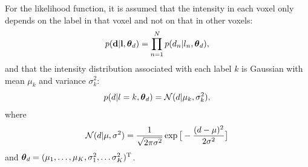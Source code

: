 \documentclass[10pt,twoside]{book}
\begin{document}
For the likelihood function, it is assumed that the intensity in each voxel only depends on the label in that voxel and not on that in other voxels:
\begin{equation}
  p(\mathbf{d} | \mathbf{l}, {\mbox{\boldmath {${\theta}$}}}_d ) = \prod_{n=1}^N p( d_n | l_n, {\mbox{\boldmath {${\theta}$}}}_d ),
  \label{eq:likelihood}
\end{equation}
and that the intensity distribution associated with each label $k$ is Gaussian with mean $\mu_k$ and variance $\sigma_k^2$:
\begin{equation}
  p( d | l=k, {\mbox{\boldmath {${\theta}$}}}_d ) = \mathcal N \mathnormal( d | \mu_k, \sigma_k^2 ),
  \label{eq:Gauss}
\end{equation}
where 
\begin{equation}
  \mathcal N \mathnormal( d | \mu, \sigma^2 ) = \frac{1}{\sqrt{ 2 \pi \sigma^2}} \exp\big[ -\frac{ ( d - \mu )^2}{ 2 \sigma^2} \big] 
\end{equation}
and ${\mbox{\boldmath {${\theta}$}}}_d = ( \mu_1, \ldots, \mu_K, \sigma_1^2, \ldots \sigma_K^2)^\mathrm{T}$.
\end{document}

